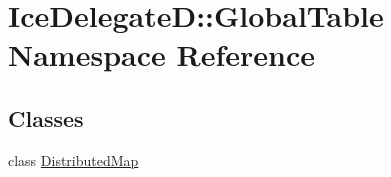 \hypertarget{namespace_ice_delegate_d_1_1_global_table}{
\section{IceDelegateD::GlobalTable Namespace Reference}
\label{namespace_ice_delegate_d_1_1_global_table}
}
\subsection*{Classes}
\begin{DoxyCompactItemize}
\item 
class \hyperlink{class_ice_delegate_d_1_1_global_table_1_1_distributed_map}{DistributedMap}
\end{DoxyCompactItemize}
